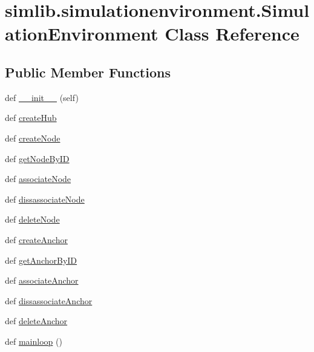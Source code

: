 \hypertarget{classsimlib_1_1simulationenvironment_1_1_simulation_environment}{}\section{simlib.\+simulationenvironment.\+Simulation\+Environment Class Reference}
\label{classsimlib_1_1simulationenvironment_1_1_simulation_environment}
\subsection*{Public Member Functions}
\begin{DoxyCompactItemize}
\item 
def \mbox{\hyperlink{classsimlib_1_1simulationenvironment_1_1_simulation_environment_a9523fb72f109de5e544efb6569f25b87}{\+\_\+\+\_\+init\+\_\+\+\_\+}} (self)
\item 
def \mbox{\hyperlink{classsimlib_1_1simulationenvironment_1_1_simulation_environment_a3663bc786f6efdb0fbeee270a89a5a09}{create\+Hub}}
\item 
def \mbox{\hyperlink{classsimlib_1_1simulationenvironment_1_1_simulation_environment_ae52e6b7ff377e9e19a42522cd556f810}{create\+Node}}
\item 
def \mbox{\hyperlink{classsimlib_1_1simulationenvironment_1_1_simulation_environment_a0ea1e1aed37d20521f1cd4a5fe45f304}{get\+Node\+By\+ID}}
\item 
def \mbox{\hyperlink{classsimlib_1_1simulationenvironment_1_1_simulation_environment_a300a94d4dcc67723f7a35c75bf17290d}{associate\+Node}}
\item 
def \mbox{\hyperlink{classsimlib_1_1simulationenvironment_1_1_simulation_environment_aeb0cf01f00d59cfdbd111e4ddae5c111}{dissassociate\+Node}}
\item 
def \mbox{\hyperlink{classsimlib_1_1simulationenvironment_1_1_simulation_environment_a5f7de813eb0a54424642ff1d57c6b0b2}{delete\+Node}}
\item 
def \mbox{\hyperlink{classsimlib_1_1simulationenvironment_1_1_simulation_environment_a2c100beae1b42193279b7eea874f05aa}{create\+Anchor}}
\item 
def \mbox{\hyperlink{classsimlib_1_1simulationenvironment_1_1_simulation_environment_a57dce9e31a624afdeb6185381cefbfd7}{get\+Anchor\+By\+ID}}
\item 
def \mbox{\hyperlink{classsimlib_1_1simulationenvironment_1_1_simulation_environment_a5c9ecc5861a006f3425c372141b419fe}{associate\+Anchor}}
\item 
def \mbox{\hyperlink{classsimlib_1_1simulationenvironment_1_1_simulation_environment_a8f5712a094eaac9c6101725d9bf7fa97}{dissassociate\+Anchor}}
\item 
def \mbox{\hyperlink{classsimlib_1_1simulationenvironment_1_1_simulation_environment_a54a6a5d3d58873223dec8396316ddf58}{delete\+Anchor}}
\item 
def \mbox{\hyperlink{classsimlib_1_1simulationenvironment_1_1_simulation_environment_ab842bfead4d18c821a01349409bc608a}{mainloop}} ()
\end{DoxyCompactItemize}
